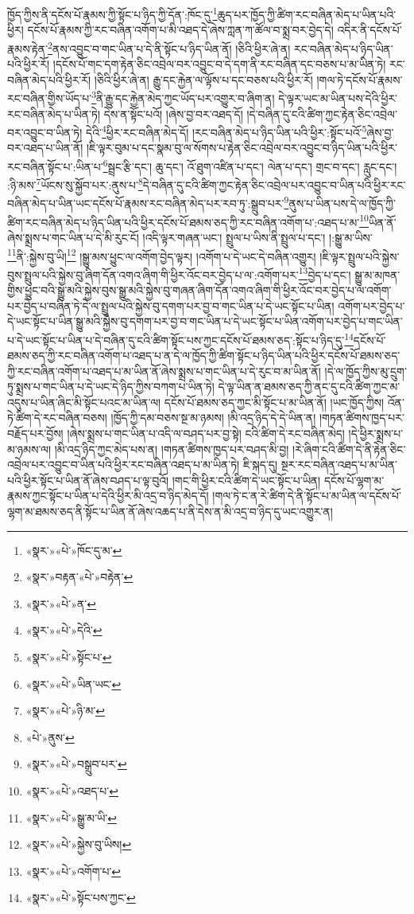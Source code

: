 ཁྱོད་ཀྱིས་ནི་དངོས་པོ་རྣམས་ཀྱི་སྟོང་པ་ཉིད་ཀྱི་དོན་:ཁོང་དུ་\footnote{«སྣར་»«པེ་»ཁོང་དུ་མ་}ཆུད་པར་ཁྱོད་ཀྱི་ཚིག་རང་བཞིན་མེད་པ་ཡིན་པའི་ཕྱིར། དངོས་པོ་རྣམས་ཀྱི་རང་བཞིན་འགོག་པ་མི་འཐད་དེ་ཞེས་ཀླན་ཀ་ཚོལ་བ་སྨྲ་བར་བྱེད་དེ། འདིར་ནི་དངོས་པོ་རྣམས་རྟེན་\footnote{«སྣར་»བརྟན་«པེ་»བརྟེན་}ནས་འབྱུང་བ་གང་ཡིན་པ་དེ་ནི་སྟོང་པ་ཉིད་ཡིན་ནོ། །ཅིའི་ཕྱིར་ཞེ་ན། རང་བཞིན་མེད་པ་ཉིད་ཡིན་པའི་ཕྱིར་རོ། །དངོས་པོ་གང་དག་རྟེན་ཅིང་འབྲེལ་བར་འབྱུང་བ་དེ་དག་ནི་རང་བཞིན་དང་བཅས་པ་མ་ཡིན་ཏེ། རང་བཞིན་མེད་པའི་ཕྱིར་རོ། །ཅིའི་ཕྱིར་ཞེ་ན། རྒྱུ་དང་རྐྱེན་ལ་ལྟོས་པ་དང་བཅས་པའི་ཕྱིར་རོ། །གལ་ཏེ་དངོས་པོ་རྣམས་རང་བཞིན་གྱིས་ཡོད་པ་\footnote{«སྣར་»«པེ་»ན་}ནི་རྒྱུ་དང་རྐྱེན་མེད་ཀྱང་ཡོད་པར་འགྱུར་བ་ཞིག་ན། དེ་ལྟར་ཡང་མ་ཡིན་པས་དེའི་ཕྱིར་རང་བཞིན་མེད་པ་ཡིན་ཏེ། དེས་ན་སྟོང་པའོ། །ཞེས་བྱ་བར་འཐད་དོ། །དེ་བཞིན་དུ་ངའི་ཚིག་ཀྱང་རྟེན་ཅིང་འབྲེལ་བར་འབྱུང་བ་ཡིན་ཏེ། དེའི་\footnote{«སྣར་»«པེ་»དེའི་}ཕྱིར་རང་བཞིན་མེད་དོ། །རང་བཞིན་མེད་པ་ཉིད་ཡིན་པའི་ཕྱིར་:སྟོང་པའོ་\footnote{«སྣར་»«པེ་»སྟོང་པ་}ཞེས་བྱ་བར་འཐད་པ་ཡིན་ནོ། །ཇི་ལྟར་བུམ་པ་དང་སྣམ་བུ་ལ་སོགས་པ་རྟེན་ཅིང་འབྲེལ་བར་འབྱུང་བ་ཉིད་ཡིན་པའི་ཕྱིར་རང་བཞིན་སྟོང་པ་:ཡིན་པ་\footnote{«སྣར་»«པེ་»ཡིན་ཡང་}སྦྲང་རྩི་དང་། ཆུ་དང་། འོ་ཐུག་འཛིན་པ་དང་། ལེན་པ་དང་། གྲང་བ་དང་། རླུང་དང་། :ཉི་མས་\footnote{«སྣར་»«པེ་»ཉི་མ་}ཡོངས་སུ་སྐྱོབ་པར་:ནུས་པ་\footnote{«པེ་»ནུས་}དེ་བཞིན་དུ་ངའི་ཚིག་ཀྱང་རྟེན་ཅིང་འབྲེལ་པར་འབྱུང་བ་ཡིན་པའི་ཕྱིར་རང་བཞིན་མེད་པ་ཡིན་ཡང་དངོས་པོ་རྣམས་རང་བཞིན་མེད་པར་རབ་ཏུ་:སྒྲུབ་པར་\footnote{«སྣར་»«པེ་»བསྒྲུབ་པར་}ནུས་པ་ཡིན་པས་དེ་ལ་ཁྱོད་ཀྱི་ཚིག་རང་བཞིན་མེད་པ་ཉིད་ཡིན་པའི་ཕྱིར་དངོས་པོ་ཐམས་ཅད་ཀྱི་རང་བཞིན་འགོག་པ་:འཐད་པ་མ་\footnote{«སྣར་»«པེ་»འཐད་པ་}ཡིན་ནོ་ཞེས་སྨྲས་པ་གང་ཡིན་པ་དེ་མི་རུང་ངོ། །འདི་ལྟར་གཞན་ཡང་། སྤྲུལ་པ་ཡིས་ནི་སྤྲུལ་པ་དང་། །:སྒྱུ་མ་ཡིས་\footnote{«སྣར་»«པེ་»སྒྱུ་མ་ཡི་}ནི་:སྐྱེས་བུ་ཡི།\footnote{«སྣར་»«པེ་»སྐྱེས་བུ་ཡིས།} །སྒྱུ་མས་ཕྱུང་ལ་འགོག་བྱེད་ལྟར། །འགོག་པ་དེ་ཡང་དེ་བཞིན་འགྱུར། །ཇི་ལྟར་སྤྲུལ་པའི་སྐྱེས་བུས་སྤྲུལ་པའི་སྐྱེས་བུ་ཞིག་དོན་འགའ་ཞིག་གི་ཕྱིར་འོང་བར་བྱེད་པ་ལ་:འགོག་པར་\footnote{«སྣར་»«པེ་»འགོག་པ་}བྱེད་པ་དང་། སྒྱུ་མ་མཁན་གྱིས་ཕྱུང་བའི་སྒྱུ་མའི་སྐྱེས་བུས་སྒྱུ་མའི་སྐྱེས་བུ་གཞན་ཞིག་དོན་འགའ་ཞིག་གི་ཕྱིར་འོང་བར་བྱེད་པ་ལ་འགོག་པར་བྱེད་པ་བཞིན་ཏེ་དེ་ལ་སྤྲུལ་པའི་སྐྱེས་བུ་དགག་པར་བྱ་བ་གང་ཡིན་པ་དེ་ཡང་སྟོང་པ་ཡིན། འགོག་པར་བྱེད་པ་དེ་ཡང་སྟོང་པ་ཡིན་སྒྱུ་མའི་སྐྱེས་བུ་དགག་པར་བྱ་བ་གང་ཡིན་པ་དེ་ཡང་སྟོང་པ་ཡིན་འགོག་པར་བྱེད་པ་གང་ཡིན་པ་དེ་ཡང་སྟོང་པ་ཡིན་པ་དེ་བཞིན་དུ་ངའི་ཚིག་སྟོང་པས་ཀྱང་དངོས་པོ་ཐམས་ཅད་:སྟོང་པ་ཉིད་དུ་\footnote{«སྣར་»«པེ་»སྟོང་པས་ཀྱང་}དངོས་པོ་ཐམས་ཅད་ཀྱི་རང་བཞིན་འགོག་པ་འཐད་པ་ན་དེ་ལ་ཁྱོད་ཀྱི་ཚིག་སྟོང་པ་ཉིད་ཡིན་པའི་ཕྱིར་དངོས་པོ་ཐམས་ཅད་ཀྱི་རང་བཞིན་འགོག་པ་འཐད་པ་མ་ཡིན་ནོ་ཞེས་སྨྲས་པ་གང་ཡིན་པ་དེ་རུང་བ་མ་ཡིན་ནོ། །དེ་ལ་ཁྱོད་ཀྱིས་མུ་དྲུག་ཏུ་སྨྲས་པ་གང་ཡིན་པ་དེ་ཡང་དེ་ཉིད་ཀྱིས་བཀག་པ་ཡིན་ཏེ། དེ་ལྟ་ཡིན་ན་ཐམས་ཅད་ཀྱི་ནང་དུ་ངའི་ཚིག་ཀྱང་མ་འདུས་པ་ཡིན་ཞིང་མི་སྟོང་པའང་མ་ཡིན་ལ། དངོས་པོ་ཐམས་ཅད་ཀྱང་མི་སྟོང་པ་མ་ཡིན་ནོ། །ཡང་ཁྱོད་ཀྱིས། འོན་ཏེ་ཚིག་དེ་རང་བཞིན་བཅས། །ཁྱོད་ཀྱི་དམ་བཅས་སྔ་མ་ཉམས། །མི་འདྲ་ཉིད་དེ་དེ་ཡིན་ན། །གཏན་ཚིགས་ཁྱད་པར་བརྗོད་པར་བྱོས། །ཞེས་སྨྲས་པ་གང་ཡིན་པ་འདི་ལ་བཤད་པར་བྱ་སྟེ། ངའི་ཚིག་དེ་རང་བཞིན་མེད། །དེ་ཕྱིར་སྨྲས་པ་མ་ཉམས་ལ། །མི་འདྲ་ཉིད་ཀྱང་མེད་པས་ན། །གཏན་ཚིགས་ཁྱད་པར་བཤད་མི་བྱ། །རེ་ཞིག་ངའི་ཚིག་དེ་ནི་རྟེན་ཅིང་འབྲེལ་པར་འབྱུང་བ་ཡིན་པའི་ཕྱིར་རང་བཞིན་འཐད་པ་མ་ཡིན་ཏེ། ཇི་སྐད་དུ། སྔར་རང་བཞིན་འཐད་པ་མ་ཡིན་པའི་ཕྱིར་སྟོང་པ་ཡིན་ནོ་ཞེས་བཤད་པ་ལྟ་བུའོ། །གང་གི་ཕྱིར་ངའི་ཚིག་དེ་ཡང་སྟོང་པ་ཡིན། དངོས་པོ་ལྷག་མ་རྣམས་ཀྱང་སྟོང་པ་ཡིན་པ་དེའི་ཕྱིར་མི་འདྲ་བ་ཉིད་མེད་དོ། །གལ་ཏེ་ང་ན་རེ་ཚིག་དེ་ནི་སྟོང་པ་མ་ཡིན་ལ་དངོས་པོ་ལྷག་མ་ཐམས་ཅད་ནི་སྟོང་པ་ཡིན་ནོ་ཞེས་འཆད་པ་ནི་དེས་ན་མི་འདྲ་བ་ཉིད་དུ་ཡང་འགྱུར་ན། 